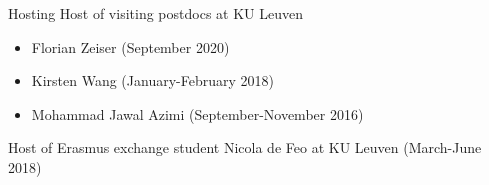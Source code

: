 \documentclass[12p]{resume}
\begin{document}
\begin{category}{Hosting} 
\citemnobullet Host of visiting postdocs at KU Leuven
\begin{itemize}
\item Florian Zeiser (September 2020)
\item Kirsten Wang (January-February 2018)
\item Mohammad Jawal Azimi  (September-November 2016)
\end{itemize}




\citemnobullet Host of Erasmus exchange student Nicola de Feo at KU Leuven (March-June 2018)


\end{category}


\end{document}
